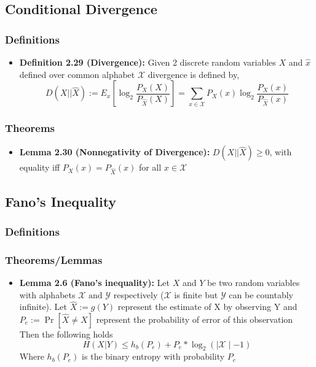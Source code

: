 \documentclass{article}
\begin{document}
\subsection{Conditional Divergence}
\subsubsection{Definitions}
\begin{itemize}
    \item \textbf{Definition 2.29 (Divergence):} Given 2 discrete random variables \(X\) and \(\hat{x}\) defined over common alphabet \(\mathcal{X}\) divergence is defined by,
    \[D(X||\hat{X}) := E_x[\log_2 \frac{P_X (X)}{P_{\hat{X}}(X)}] = \sum_{x \in \mathcal{X}} P_X(x) \log_2 \frac{P_X(x)}{P_{\hat{X}}(x)}\]
\end{itemize}
\subsubsection{Theorems}
\begin{itemize}
    \item \textbf{Lemma 2.30 (Nonnegativity of Divergence):} \(D(X||\hat{X}) \geq 0\), with equality iff \(P_X(x) = P_{\hat{X}}(x)\) for all \(x \in \mathcal{X}\)
\end{itemize}

\subsection{Fano's Inequality}
\subsubsection{Definitions}
\subsubsection{Theorems/Lemmas}
\begin{itemize}
    \item \textbf{Lemma 2.6 (Fano's inequality):} Let \(X\) and \(Y\) be two random variables with alphabets \(\mathcal{X} \text{ and } \mathcal{Y}\) respectively (\(\mathcal{X}\) is finite but \(\mathcal{Y}\) can be countably infinite).
    Let \(\hat{X} := g(Y)\) represent the estimate of X by observing Y and \(P_e := \Pr[\hat{X} \neq X]\) represent the probability of error of this observation
    \\Then the following holds
    \[H(X|Y) \leq h_b(P_e) + P_e * \log_{2} (\mid \mathcal{X} \mid -1)\]
    Where \(h_b(P_e)\) is the binary entropy with probability \(P_e\)
\end{itemize}
\end{document}
